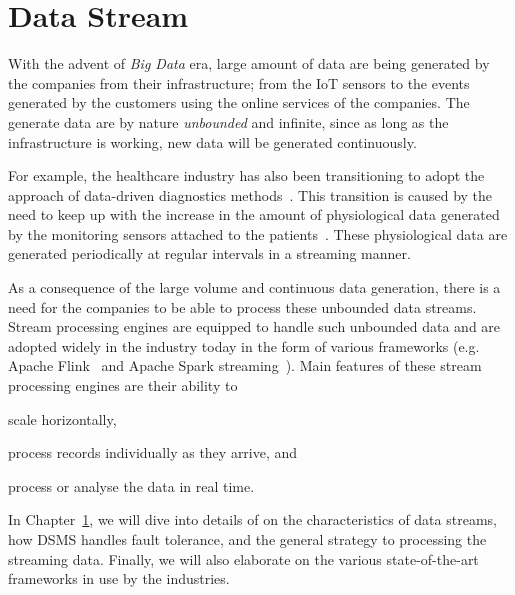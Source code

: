 \chapter{Data Stream} 
\label{chap:data_stream_processing}
With the advent of \emph{Big Data} era, large amount of data are being generated 
by the companies from their infrastructure; from the IoT sensors to the events 
generated by the customers using the online services of the companies. The generate data 
are by nature \emph{unbounded} and infinite,  since as long 
as the infrastructure is working, new data will be generated continuously. 

For example, the healthcare industry has also been transitioning to 
adopt the approach of data-driven diagnostics methods~\cite{hospital_diagnosis}. 
This transition is caused by the need to keep up with the increase in the amount 
of physiological data generated by the monitoring sensors attached to the 
patients~\cite{hospital_data_monitoring}. These physiological data are generated 
periodically at regular intervals in a streaming manner. 

As a consequence of the large volume and continuous data generation, there is a need for 
the companies to be able to process these unbounded data streams.
Stream processing engines are equipped to handle such unbounded data and are adopted 
widely in the industry today in the form of various frameworks (e.g. Apache Flink~\cite{flink} and 
Apache Spark streaming~\cite{spark_streaming}). Main features of these stream 
processing engines are their ability to 
\renewcommand{\labelenumi}{(\roman{enumi})}
\begin{enumerate*}
    \item scale horizontally, 
    \item process records individually as they arrive, and
    \item process or analyse the data in real time.
\end{enumerate*}

In Chapter~\ref{chap:data_stream_processing}, we will dive into details of 
on the characteristics of data streams, how DSMS handles fault tolerance, and
the general strategy to processing the streaming data. Finally, we will also elaborate on the 
various state-of-the-art frameworks in use by the industries.

